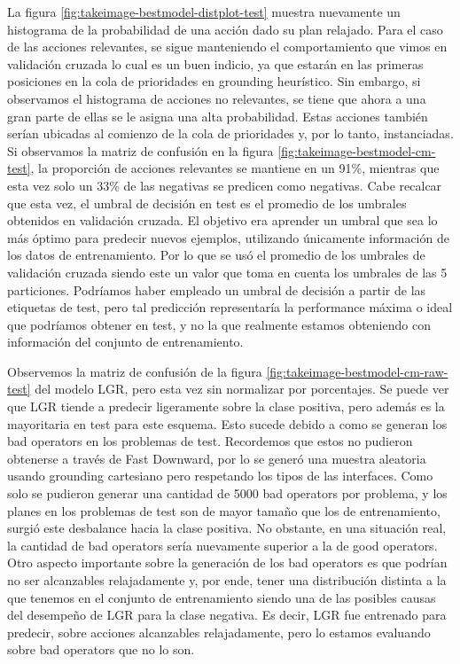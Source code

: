 La figura \ref{fig:takeimage-bestmodel-distplot-test} muestra nuevamente un
histograma de la probabilidad de una acción dado su plan relajado. Para el caso
de las acciones relevantes, se sigue manteniendo el comportamiento que vimos en
validación cruzada lo cual es un buen indicio, ya que estarán en las primeras
posiciones en la cola de prioridades en grounding heurístico. Sin embargo, si
observamos el histograma de acciones no relevantes, se tiene que ahora a una
gran parte de ellas se le asigna una alta probabilidad. Estas acciones también
serían ubicadas al comienzo de la cola de prioridades y, por lo tanto,
instanciadas. Si observamos la matriz de confusión en la figura
\ref{fig:takeimage-bestmodel-cm-test}, la proporción de acciones relevantes se
mantiene en un 91\%, mientras que esta vez solo un 33\% de las negativas se
predicen como negativas. Cabe recalcar que esta vez, el umbral de decisión en
test es el promedio de los umbrales obtenidos en validación cruzada. El objetivo
era aprender un umbral que sea lo más óptimo para predecir nuevos ejemplos,
utilizando únicamente información de los datos de entrenamiento. Por lo que se
usó el promedio de los umbrales de validación cruzada siendo este un valor
que toma en cuenta los umbrales de las 5 particiones. Podríamos haber
empleado un umbral de decisión a partir de las etiquetas de test, pero
tal predicción representaría la performance máxima o ideal que podríamos obtener
en test, y no la que realmente estamos obteniendo con información del conjunto
de entrenamiento.

Observemos la matriz de confusión de la figura
\ref{fig:takeimage-bestmodel-cm-raw-test} del modelo LGR, pero esta vez sin
normalizar por porcentajes. Se puede ver que LGR tiende a predecir ligeramente
sobre la clase positiva, pero además es la mayoritaria en test para este
esquema. Esto sucede debido a como se generan los bad operators en los problemas
de test. Recordemos que estos no pudieron obtenerse a través de Fast Downward,
por lo se generó una muestra aleatoria usando grounding cartesiano pero
respetando los tipos de las interfaces. Como solo se pudieron generar una
cantidad de 5000 bad operators por problema, y los planes en los problemas de
test son de mayor tamaño que los de entrenamiento, surgió este desbalance hacia
la clase positiva. No obstante, en una situación real, la cantidad de bad
operators sería nuevamente superior a la de good operators. Otro aspecto
importante sobre la generación de los bad operators es que podrían no ser
alcanzables relajadamente y, por ende, tener una distribución distinta a la
que tenemos en el conjunto de entrenamiento siendo una de las posibles causas
del desempeño de LGR para la clase negativa. Es decir, LGR fue entrenado para
predecir, sobre acciones alcanzables relajadamente, pero lo estamos evaluando
sobre bad operators que no lo son.

